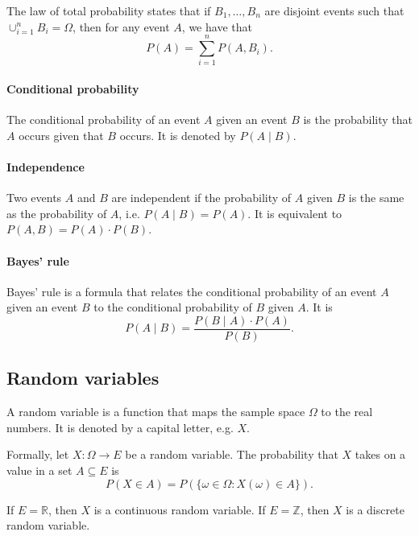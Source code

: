 The law of total probability states that if $B_1, \dots, B_n$ are disjoint events
such that $\cup_{i = 1}^n B_i = \Omega$, then for any event $A$, we have that
$$P(A) = \sum_{i = 1}^n P(A, B_i)\text{.}$$

\paragraph{Conditional probability}

The conditional probability of an event $A$ given an event $B$ is the probability
that $A$ occurs given that $B$ occurs.  It is denoted by $P(A \mid B)$.

\paragraph{Independence}

Two events $A$ and $B$ are independent if the probability of $A$ given $B$ is the
same as the probability of $A$, i.e. $P(A \mid B) = P(A)$.  It is equivalent to
$P(A, B) = P(A) \cdot P(B)$.

\paragraph{Bayes' rule}

Bayes' rule is a formula that relates the conditional probability of an event $A$
given an event $B$ to the conditional probability of $B$ given $A$.  It is
\begin{equation}
  \label{eq:bayes}
  P(A \mid B) = \frac{P(B \mid A) \cdot P(A)}{P(B)}\text{.}
\end{equation}

\subsection{Random variables}

A random variable is a function that maps the sample space $\Omega$ to the real
numbers.  It is denoted by a capital letter, e.g. $X$.

Formally, let $X : \Omega \rightarrow E$ be a random variable.  The
probability that $X$ takes on a value in a set $A \subseteq E$ is
\begin{equation}
  \label{eq:rv}
  P(X \in A) = P(\{\omega \in \Omega : X(\omega) \in A\})\text{.}
\end{equation}

If $E = \mathbb{R}$, then $X$ is a continuous random variable.  If $E = \mathbb{Z}$,
then $X$ is a discrete random variable.

